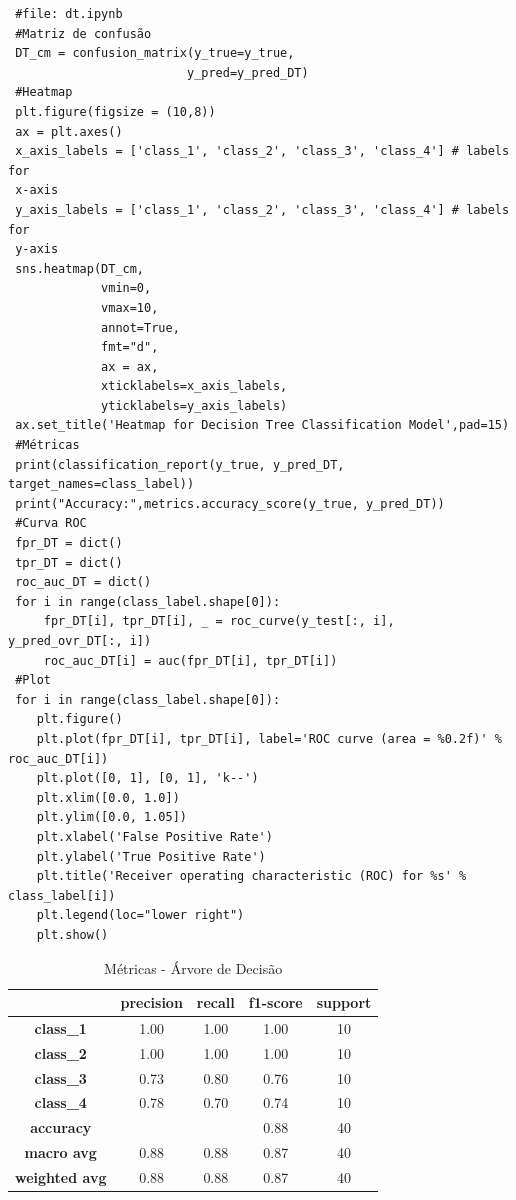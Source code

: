 \documentclass[
	article,			%
	11pt,				%
	oneside,			%
	a4paper,			%
	english,			%
	brazil,				%
	sumario=tradicional
	]{abntex2}
\begin{document}
\begin{verbatim}
 #file: dt.ipynb
 #Matriz de confusão
 DT_cm = confusion_matrix(y_true=y_true, 
                         y_pred=y_pred_DT)
 #Heatmap
 plt.figure(figsize = (10,8))
 ax = plt.axes()
 x_axis_labels = ['class_1', 'class_2', 'class_3', 'class_4'] # labels for
 x-axis
 y_axis_labels = ['class_1', 'class_2', 'class_3', 'class_4'] # labels for
 y-axis
 sns.heatmap(DT_cm,
             vmin=0,
             vmax=10,
             annot=True,
             fmt="d",
             ax = ax,
             xticklabels=x_axis_labels, 
             yticklabels=y_axis_labels)
 ax.set_title('Heatmap for Decision Tree Classification Model',pad=15)
 #Métricas
 print(classification_report(y_true, y_pred_DT, target_names=class_label))
 print("Accuracy:",metrics.accuracy_score(y_true, y_pred_DT))
 #Curva ROC
 fpr_DT = dict()
 tpr_DT = dict()
 roc_auc_DT = dict()
 for i in range(class_label.shape[0]):
     fpr_DT[i], tpr_DT[i], _ = roc_curve(y_test[:, i], y_pred_ovr_DT[:, i])
     roc_auc_DT[i] = auc(fpr_DT[i], tpr_DT[i])
 #Plot
 for i in range(class_label.shape[0]):
    plt.figure()
    plt.plot(fpr_DT[i], tpr_DT[i], label='ROC curve (area = %0.2f)' % roc_auc_DT[i])
    plt.plot([0, 1], [0, 1], 'k--')
    plt.xlim([0.0, 1.0])
    plt.ylim([0.0, 1.05])
    plt.xlabel('False Positive Rate')
    plt.ylabel('True Positive Rate')
    plt.title('Receiver operating characteristic (ROC) for %s' % class_label[i])
    plt.legend(loc="lower right")
    plt.show()
\end{verbatim}

\newpage
\begin{table}[H]
\centering
\begin{tabular}{c|c|c|c|c|}
\cline{2-5}
                                            & \textbf{precision} & \textbf{recall} & \textbf{f1-score} & \textbf{support} \\ \hline
\multicolumn{1}{|c|}{\textbf{class\_1}}     & 1.00               & 1.00            & 1.00              & 10               \\ \hline
\multicolumn{1}{|c|}{\textbf{class\_2}}     & 1.00               & 1.00            & 1.00              & 10               \\ \hline
\multicolumn{1}{|c|}{\textbf{class\_3}}     & 0.73               & 0.80            & 0.76              & 10               \\ \hline
\multicolumn{1}{|c|}{\textbf{class\_4}}     & 0.78               & 0.70            & 0.74              & 10               \\ \hline
\multicolumn{1}{|c|}{\textbf{accuracy}}     &                    &                 & 0.88              & 40               \\ \hline
\multicolumn{1}{|c|}{\textbf{macro avg}}    & 0.88               & 0.88            & 0.87              & 40               \\ \hline
\multicolumn{1}{|c|}{\textbf{weighted avg}} & 0.88               & 0.88            & 0.87              & 40               \\ \hline
\end{tabular}
\caption{Métricas - Árvore de Decisão}
\label{tab:dt_01}
\end{table}
\end{document}
